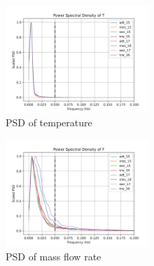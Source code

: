 \begin{multicols}{2}
       \begin{figure}[H]
        \centering
        \includegraphics[width=0.48\textwidth]{./figs/bfr_smth/truck_psd/T.png}
        \caption{PSD of temperature}
       \end{figure}

       \begin{figure}[H]
        \centering
        \includegraphics[width=0.48\textwidth]{./figs/bfr_smth/truck_psd/F.png}
        \caption{PSD of mass flow rate}
       \end{figure}
\end{multicols}
